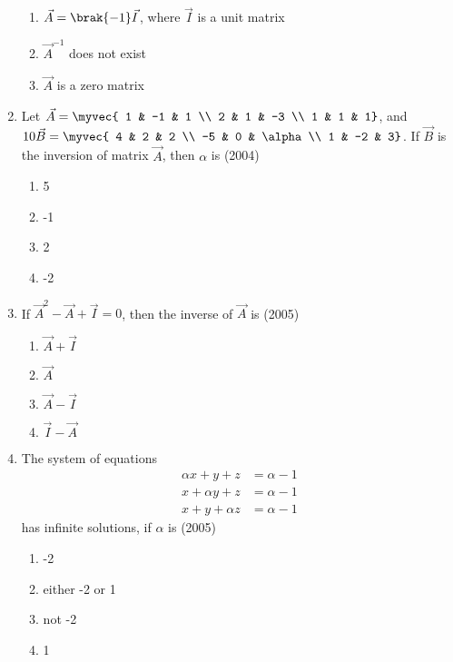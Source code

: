 \begin{enumerate}[label=\thesubsection.\arabic*.,ref=\thesubsection.\theenumi]
\begin{multicols}{2}
\begin{enumerate}
			\item $\vec{A} = \brak{-1}\vec{I}$, where $\vec{I}$ is a unit matrix
			\item $\vec{A}^{-1}$ does not exist
			\item $\vec{A}$ is a zero matrix
		\end{enumerate}
\end{multicols}
	\item Let $\vec{A}=\myvec{
			1 & -1 & 1 \\
			2 & 1 & -3 \\
			1 & 1 & 1}$, and $10\vec{B}=\myvec{
			4 & 2 & 2 \\
			-5 & 0 & \alpha \\
			1 & -2 & 3}$. If $\vec{B}$ is the inversion of matrix $\vec{A}$, then $\alpha$ is \hfill{(2004)}
\begin{multicols}{4}
		\begin{enumerate}
			\item 5
			\item -1
			\item 2
			\item -2
		\end{enumerate}
\end{multicols}
	\item If $\vec{A}^2-\vec{A}+\vec{I}=0$, then the inverse of $\vec{A}$ is \hfill{(2005)}
\begin{multicols}{4}
		\begin{enumerate}
			\item $\vec{A}+\vec{I}$
			\item $\vec{A}$
			\item $\vec{A}-\vec{I}$
			\item $\vec{I}-\vec{A}$
		\end{enumerate}
\end{multicols}
	\item The system of equations 
\begin{align*}
	\alpha x+y+z  &= \alpha -1  \\
		x+ \alpha y+z &= \alpha -1 \\
		x+y+ \alpha z &= \alpha -1 
\end{align*}
		has infinite solutions, if $\alpha$ is \hfill{(2005)}
\begin{multicols}{4}
		\begin{enumerate}
			\item -2
			\item either -2 or 1
			\item not -2
			\item 1

\end{enumerate}
\end{multicols}
\end{enumerate}
